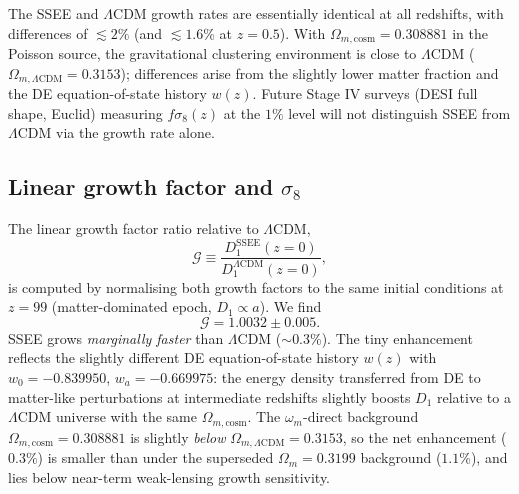 \documentclass[12pt,a4paper]{article}
\begin{document}
The SSEE and $\Lambda$CDM growth rates are essentially identical at all redshifts,
with differences of $\lesssim 2\%$ (and $\lesssim 1.6\%$ at $z=0.5$).
With $\Omega_{m,\mathrm{cosm}} = 0.308881$ in the Poisson source, the gravitational
clustering environment is close to $\Lambda$CDM ($\Omega_{m,\Lambda\mathrm{CDM}}=0.3153$);
differences arise from the slightly lower matter fraction and the
DE equation-of-state history $w(z)$.
Future Stage IV surveys (DESI full shape, Euclid) measuring $f\sigma_8(z)$ at
the $1\%$ level will not distinguish SSEE from $\Lambda$CDM via the growth rate alone.

\subsection{Linear growth factor and $\sigma_8$}
\label{subsec:sigma8}

The linear growth factor ratio relative to $\Lambda$CDM,
\begin{equation}
  \mathcal{G} \equiv \frac{D_1^{\mathrm{SSEE}}(z=0)}{D_1^{\Lambda\mathrm{CDM}}(z=0)},
  \label{eq:G_factor}
\end{equation}
is computed by normalising both growth factors to the same initial conditions
at $z=99$ (matter-dominated epoch, $D_1 \propto a$).
We find
\begin{equation}
  \mathcal{G} = 1.0032 \pm 0.005.
  \label{eq:G_value}
\end{equation}
SSEE grows \emph{marginally faster} than $\Lambda$CDM ($\sim$0.3\%).
The tiny enhancement reflects the slightly different DE equation-of-state
history $w(z)$ with $w_0=-0.839950$, $w_a=-0.669975$: the energy density transferred
from DE to matter-like perturbations at intermediate redshifts slightly boosts
$D_1$ relative to a $\Lambda$CDM universe with the same $\Omega_{m,\mathrm{cosm}}$.
The $\omega_m$-direct background $\Omega_{m,\mathrm{cosm}}=0.308881$ is slightly
\emph{below} $\Omega_{m,\Lambda\mathrm{CDM}}=0.3153$, so the net enhancement
($0.3\%$) is smaller than under the superseded $\Omega_{m}=0.3199$ background
($1.1\%$), and lies below near-term weak-lensing growth sensitivity.
\end{document}

